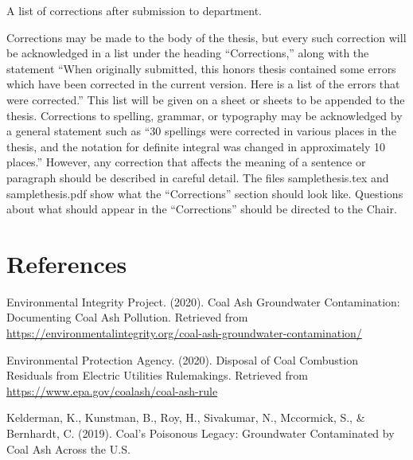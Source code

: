 \documentclass[12pt, twoside]{amherstthesis}
\newlength{\cslhangindent}
\newenvironment{cslreferences}%
  {\setlength{\parindent}{0pt}%
  \everypar{\setlength{\hangindent}{\cslhangindent}}\ignorespaces}%
  {\par}
\begin{document}
A list of corrections after submission to department.

Corrections may be made to the body of the thesis, but every such correction will be acknowledged in a list under the heading ``Corrections,'' along with the statement ``When originally submitted, this honors thesis contained some errors which have been corrected in the current version. Here is a list of the errors that were corrected.'' This list will be given on a sheet or sheets to be appended to the thesis. Corrections to spelling, grammar, or typography may be acknowledged by a general statement such as ``30 spellings were corrected in various places in the thesis, and the notation for definite integral was changed in approximately 10 places.'' However, any correction that affects the meaning of a sentence or paragraph should be described in careful detail. The files samplethesis.tex and samplethesis.pdf show what the ``Corrections'' section should look like. Questions about what should appear in the ``Corrections'' should be directed to the Chair.

\backmatter

\hypertarget{references}{%
\chapter*{References}\label{references}}

\noindent

\setlength{\parindent}{-0.20in}
\setlength{\leftskip}{0.20in}
\setlength{\parskip}{8pt}

\hypertarget{refs}{}
\begin{cslreferences}
\leavevmode\hypertarget{ref-EIP2020}{}%
Environmental Integrity Project. (2020). Coal Ash Groundwater Contamination: Documenting Coal Ash Pollution. Retrieved from \url{https://environmentalintegrity.org/coal-ash-groundwater-contamination/}

\leavevmode\hypertarget{ref-Car2020}{}%
Environmental Protection Agency. (2020). Disposal of Coal Combustion Residuals from Electric Utilities Rulemakings. Retrieved from \url{https://www.epa.gov/coalash/coal-ash-rule}

\leavevmode\hypertarget{ref-Kelderman2019}{}%
Kelderman, K., Kunstman, B., Roy, H., Sivakumar, N., Mccormick, S., \& Bernhardt, C. (2019). Coal's Poisonous Legacy: Groundwater Contaminated by Coal Ash Across the U.S.
\end{cslreferences}
\end{document}
